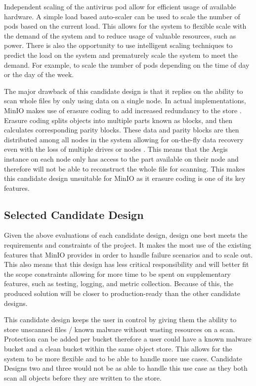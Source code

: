\documentclass[12pt, conference, final, a4paper, onecolumn, compsoc]{IEEEtran}
\begin{document}
Independent scaling of the antivirus pod allow for efficient usage of available
hardware. A simple load based auto-scaler can be used to scale the number of
pods based on the current load. This allows for the system to flexible scale
with the demand of the system and to reduce usage of valuable resources, such as
power. There is also the opportunity to use intelligent scaling techniques to
predict the load on the system and prematurely scale the system to meet the
demand. For example, to scale the number of pods depending on the time of day or
the day of the week.

The major drawback of this candidate design is that it replies on the ability to
scan whole files by only using data on a single node. In actual implementations,
MinIO makes use of erasure coding to add increased redundancy to the store
\citep{minio-erasure}. Erasure coding splits objects into multiple parts known
as blocks, and then calculates corresponding parity blocks. These data and
parity blocks are then distributed among all nodes in the system allowing for
on-the-fly data recovery even with the loss of multiple drives or nodes . This
means that the Aegis instance on each node only has access to the part available
on their node and therefore will not be able to reconstruct the whole file for
scanning. This makes this candidate design unsuitable for MinIO as it erasure
coding is one of its key features.

\subsection{Selected Candidate Design}

Given the above evaluations of each candidate design, design one best meets the
requirements and constraints of the project. It makes the most use of the
existing features that MinIO provides in order to handle failure scenarios and
to scale out. This also means that this design has less critical responsibility
and will better fit the scope constraints allowing for more time to be spent on
supplementary features, such as testing, logging, and metric collection. Because
of this, the produced solution will be closer to production-ready than the other
candidate designs.

This candidate design keeps the user in control by giving them the ability to
store unscanned files / known malware without wasting resources on a scan.
Protection can be added per bucket therefore a user could have a known malware
bucket and a clean bucket within the same object store. This allows for the
system to be more flexible and to be able to handle more use cases. Candidate
Designs two and three would not be as able to handle this use case as they both
scan all objects before they are written to the store.
\end{document}
